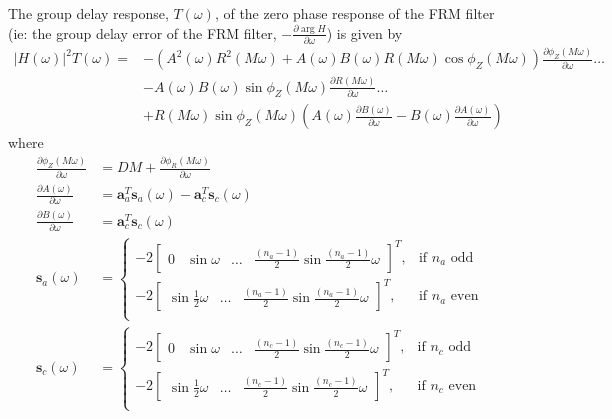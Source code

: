 \documentclass[a4paper,twoside,10pt,english]{report}
\begin{document}
The group delay response, $T\left(\omega\right)$, of the zero phase response 
of the FRM filter (ie: the group delay error of the FRM 
filter, $-\frac{\partial \arg H}{\partial\omega}$) is given by 
\begin{align*}
\left|H\left(\omega\right)\right|^{2}T\left(\omega\right) =&
  -\left(A^{2}\left(\omega\right)R^{2}\left(M\omega\right)+
   A\left(\omega\right)B\left(\omega\right)R\left(M\omega\right)
   \cos\phi_{Z}\left(M\omega\right)\right)
   \frac{\partial\phi_{Z}\left(M\omega\right)}{\partial\omega} \hdots \\
& -A\left(\omega\right)B\left(\omega\right)\sin\phi_{Z}\left(M\omega\right)
   \frac{\partial R\left(M\omega\right)}{\partial\omega} \hdots \\
& +R\left(M\omega\right)\sin\phi_{Z}\left(M\omega\right)
\left(A\left(\omega\right)\frac{\partial B\left(\omega\right)}{\partial\omega}
-B\left(\omega\right)\frac{\partial A\left(\omega\right)}{\partial\omega}\right)
\end{align*}
where
\begin{align*}
\frac{\partial \phi_{Z}\left(M\omega\right)}{\partial\omega} &=
DM+\frac{\partial \phi_{R}\left(M\omega\right)}{\partial\omega}\\
\frac{\partial A\left(\omega\right)}{\partial\omega} &=
\boldsymbol{a}_{a}^{T}\boldsymbol{s}_{a}\left(\omega\right)-
\boldsymbol{a}_{c}^{T}\boldsymbol{s}_{c}\left(\omega\right) \\
\frac{\partial B\left(\omega\right)}{\partial\omega} &=
\boldsymbol{a}_{c}^{T}\boldsymbol{s}_{c}\left(\omega\right) \\
\boldsymbol{s}_{a}\left(\omega\right) &= \begin{cases}
-2\left[\begin{array}{cccc}
0 & \sin \omega & \hdots & \frac{\left(n_{a}-1\right)}{2}
                           \sin\frac{\left(n_{a}-1\right)}{2}\omega
\end{array}\right]^{T}, & \text{if $n_{a}$ odd} \\
-2\left[\begin{array}{ccc}
\sin \frac{1}{2}\omega & \hdots & \frac{\left(n_{a}-1\right)}{2}
                           \sin\frac{\left(n_{a}-1\right)}{2}\omega
\end{array}\right]^{T}, & \text{if $n_{a}$ even} \\
\end{cases}\\
\boldsymbol{s}_{c}\left(\omega\right) &= \begin{cases}
-2\left[\begin{array}{cccc}
0 & \sin \omega & \hdots & \frac{\left(n_{c}-1\right)}{2}
                           \sin\frac{\left(n_{c}-1\right)}{2}\omega
\end{array}\right]^{T}, & \text{if $n_{c}$ odd} \\
-2\left[\begin{array}{ccc}
\sin \frac{1}{2}\omega & \hdots & \frac{\left(n_{c}-1\right)}{2}
                                  \sin\frac{\left(n_{c}-1\right)}{2}\omega
\end{array}\right]^{T}, & \text{if $n_{c}$ even} \\
\end{cases}
\end{align*}
\end{document}
